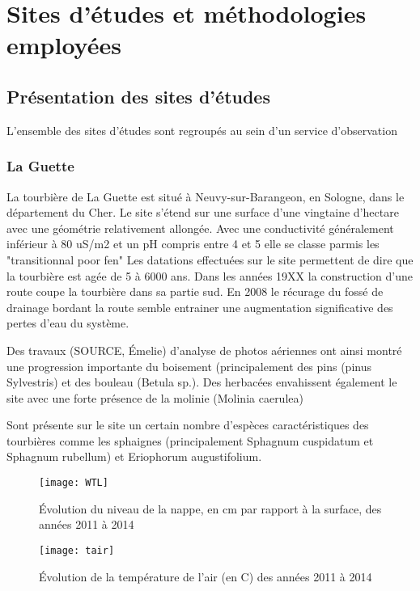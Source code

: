 
\chapter{Sites d'études et méthodologies employées}
\newpage

\section{Présentation des sites d'études}

L'ensemble des sites d'études sont regroupés au sein d'un service d'observation

\subsection{La Guette}

La tourbière de La Guette est situé à Neuvy-sur-Barangeon, en Sologne, dans le département du Cher.
Le site s'étend sur une surface d'une vingtaine d'hectare avec une géométrie relativement allongée.
Avec une conductivité généralement inférieur à 80 uS/m2 et un pH compris entre 4 et 5 elle se classe parmis les "transitionnal poor fen"
Les datations effectuées sur le site permettent de dire que la tourbière est agée de 5 à 6000 ans.
Dans les années 19XX la construction d'une route coupe la tourbière dans sa partie sud.
En 2008 le récurage du fossé de drainage bordant la route semble entrainer une augmentation significative des pertes d'eau du système.

Des travaux (SOURCE, Émelie) d'analyse de photos aériennes ont ainsi montré une progression importante du boisement (principalement des pins (pinus Sylvestris) et des bouleau (Betula sp.). Des herbacées envahissent également le site avec une forte présence de la molinie (Molinia caerulea)

Sont présente sur le site un certain nombre d'espèces caractéristiques des tourbières comme les sphaignes (principalement Sphagnum cuspidatum et Sphagnum rubellum) et Eriophorum augustifolium.

\begin{figure}
\centering
\texttt{[image: WTL]}
\caption{Évolution du niveau de la nappe, en cm par rapport à la surface, des années 2011 à 2014}
\label{fig:WTL}
\end{figure}

\begin{figure}
\centering
\texttt{[image: tair]}
\caption{Évolution de la température de l'air (en \textdegree C) des années 2011 à 2014}
\label{fig:tair}
\end{figure}

